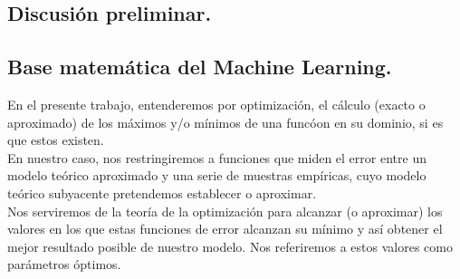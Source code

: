 \documentclass[a4paper,10pt]{article}
\begin{document}
\subsection{Discusión preliminar.}
\subsection{Base matemática del Machine Learning.}
\label{}

En el presente trabajo, entenderemos por optimización, el cálculo (exacto o
aproximado) de los máximos y/o mínimos de una funcóon en su dominio, si es
que estos existen.\\
En nuestro caso, nos restringiremos a funciones que miden el error entre
un modelo teórico aproximado y una serie de muestras empíricas, cuyo modelo
teórico subyacente pretendemos establecer o aproximar.
\\Nos serviremos de la teoría de la optimización para alcanzar (o aproximar) los valores en los que estas funciones de error alcanzan su mínimo y así obtener el mejor resultado posible de nuestro modelo. Nos referiremos a estos valores como parámetros óptimos.
\end{document}
